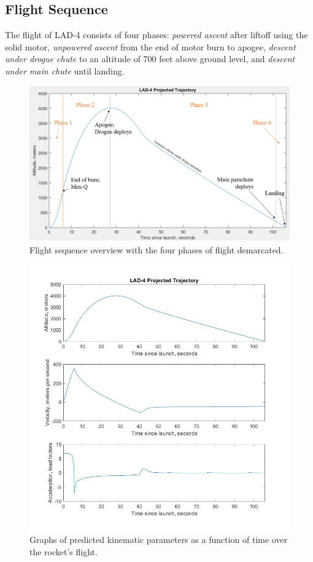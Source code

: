 \subsection{Flight Sequence} %
\label{sub:flight_sequence}
The flight of LAD-4 consists of four phases: \textit{powered ascent} after liftoff using the solid motor, \textit{unpowered ascent} from the end of motor burn to apogee, \textit{descent under drogue chute} to an altitude of 700 feet above ground level, and \textit{descent under main chute} until landing. 
\begin{figure}[H]
	\centering
	\includegraphics[width=5.5in]{imgs/flightsequence.png}
	\caption{Flight sequence overview with the four phases of flight demarcated.}
	\label{fig:flightsequence}
\end{figure}
\begin{figure}[H]
	\centering
	\includegraphics[width=5.5in]{imgs/kinematicsvtime.jpg}
	\caption{Graphs of predicted kinematic parameters as a function of time over the rocket’s flight.}
	\label{fig:kinematics}
\end{figure}

